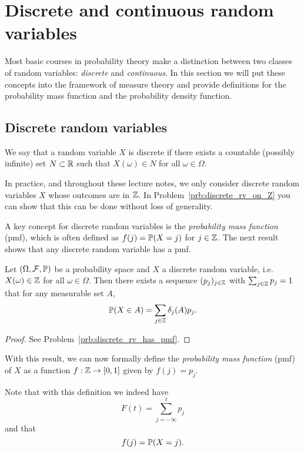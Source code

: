 \section{Discrete and continuous random variables}

Most basic courses in probability theory make a distinction between two classes of random variables: \emph{discrete} and \emph{continuous}. In this section we will put these concepts into the framework of measure theory and provide definitions for the probability mass function and the probability density function.

\subsection{Discrete random variables}
We say that a random variable $X$ is discrete if there exists a countable (possibly infinite) set $N \subset \mathbb R$ such that $X(\omega) \in N$ for all $\omega \in \Omega$. 

In practice, and throughout these lecture notes, we only consider discrete random variables $X$ whose outcomes are in $\mathbb Z$. In Problem~\ref{prb:discrete_rv_on_Z} you can show that this can be done without loss of generality. 

A key concept for discrete random variables is the \emph{probability mass function} (pmf), which is often defined as $f(j) = \mathbb P(X = j)$ for $j \in \mathbb Z$. The next result shows that any discrete random variable has a pmf.

\begin{lemma}\label{lem:existence_pmf}
Let $(\Omega, \mathcal F, \mathbb{P})$ be a probability space and $X$ a discrete random variable, i.e. $X(\omega) \in \mathbb Z$ for all $\omega \in \Omega$. Then there exists a sequence $(p_j)_{j \in \mathbb Z}$ with $\sum_{j \in \mathbb Z} p_j = 1$ that for any measurable set $A$,
\[
	\mathbb P(X \in A) = \sum_{j \in \mathbb Z} \delta_j(A) p_j.
\]
\end{lemma}

\begin{proof}
See Problem~\ref{prb:discrete_rv_has_pmf}.
\end{proof}

With this result, we can now formally define the \emph{probability mass function} (pmf) of $X$ as a function $f : \mathbb Z \to [0,1]$ given by $f(j) = p_j$.

Note that with this definition we indeed have
\[
	F(t) = \sum_{j = -\infty}^t p_j
\]
and that
\[
	f(j) = \mathbb P(X = j).
\]

